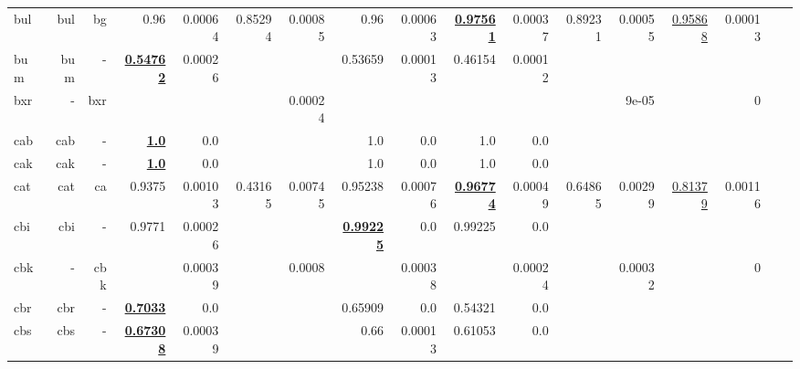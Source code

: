 \documentclass[11pt]{article}
\begin{document}
\begin{table*}[h]
{\begin{tabular}{lrrrrrrrrrrrrrrrr}
bul         & bul         & bg         & 0.96         & 0.00064         & 0.85294         & 0.00085         & 0.96         & 0.00063         & \textbf{\underline{0.97561}}         & 0.00037         & 0.89231         & 0.00055         & \underline{0.95868}         & 0.00013         \\
bum         & bum         & -         & \textbf{\underline{0.54762}}         & 0.00026         &          &          & 0.53659         & 0.00013         & 0.46154         & 0.00012         &          &          &          &          \\
bxr         & -         & bxr         &          &          &          & 0.00024         &          &          &          &          &          & 9e-05         &          & 0         \\
cab         & cab         & -         & \textbf{\underline{1.0}}         & 0.0         &          &          & 1.0         & 0.0         & 1.0         & 0.0         &          &          &          &          \\
cak         & cak         & -         & \textbf{\underline{1.0}}         & 0.0         &          &          & 1.0         & 0.0         & 1.0         & 0.0         &          &          &          &          \\
cat         & cat         & ca         & 0.9375         & 0.00103         & 0.43165         & 0.00745         & 0.95238         & 0.00076         & \textbf{\underline{0.96774}}         & 0.00049         & 0.64865         & 0.00299         & \underline{0.81379}         & 0.00116         \\
cbi         & cbi         & -         & 0.9771         & 0.00026         &          &          & \textbf{\underline{0.99225}}         & 0.0         & 0.99225         & 0.0         &          &          &          &          \\
cbk         & -         & cbk         &          & 0.00039         &          & 0.0008         &          & 0.00038         &          & 0.00024         &          & 0.00032         &          & 0         \\
cbr         & cbr         & -         & \textbf{\underline{0.7033}}         & 0.0         &          &          & 0.65909         & 0.0         & 0.54321         & 0.0         &          &          &          &          \\
cbs         & cbs         & -         & \textbf{\underline{0.67308}}         & 0.00039         &          &          & 0.66         & 0.00013         & 0.61053         & 0.0         &          &          &          &          \\

\end{tabular}}
\end{table*}
\end{document}
